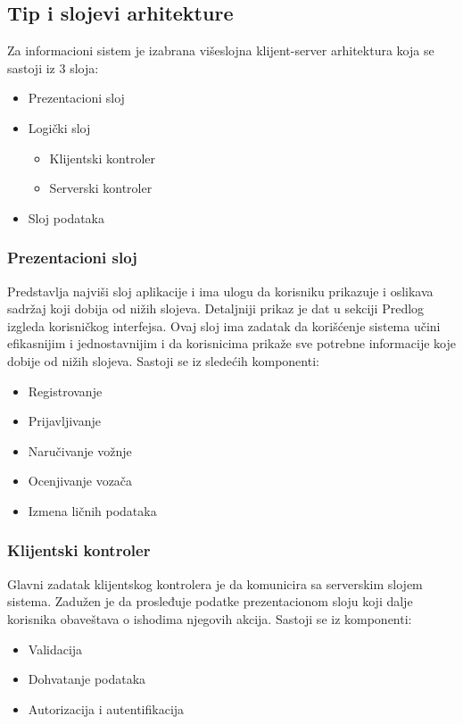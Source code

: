 \newpage

\subsection{\bfseries Tip i slojevi arhitekture}

Za informacioni sistem je izabrana višeslojna klijent-server arhitektura koja se sastoji iz 3 sloja:
\begin{itemize}
    \item Prezentacioni sloj
    \item Logički sloj
    \begin{itemize}
        \item Klijentski kontroler
        \item Serverski kontroler
    \end{itemize}
    \item Sloj podataka
\end{itemize}

\subsubsection{\bfseries Prezentacioni sloj}

Predstavlja najviši sloj aplikacije i ima ulogu da korisniku
prikazuje i oslikava sadržaj koji dobija od nižih slojeva. Detaljniji prikaz je dat u sekciji Predlog izgleda korisničkog interfejsa. Ovaj sloj ima zadatak da korišćenje sistema učini efikasnijim i jednostavnijim i da korisnicima prikaže sve potrebne informacije koje dobije od nižih slojeva.
\newline
Sastoji se iz sledećih komponenti:
\begin{itemize}
    \item Registrovanje
    \item Prijavljivanje
    \item Naručivanje vožnje
    \item Ocenjivanje vozača
    \item Izmena ličnih podataka
\end{itemize}

\subsubsection{\bfseries Klijentski kontroler}

Glavni zadatak klijentskog kontrolera je da komunicira sa serverskim slojem sistema. Zadužen je da prosleđuje podatke prezentacionom sloju koji dalje korisnika obaveštava o ishodima njegovih akcija.
\newline
Sastoji se iz komponenti:
\begin{itemize}
    \item Validacija
    \item Dohvatanje podataka
    \item Autorizacija i autentifikacija
\end{itemize}

